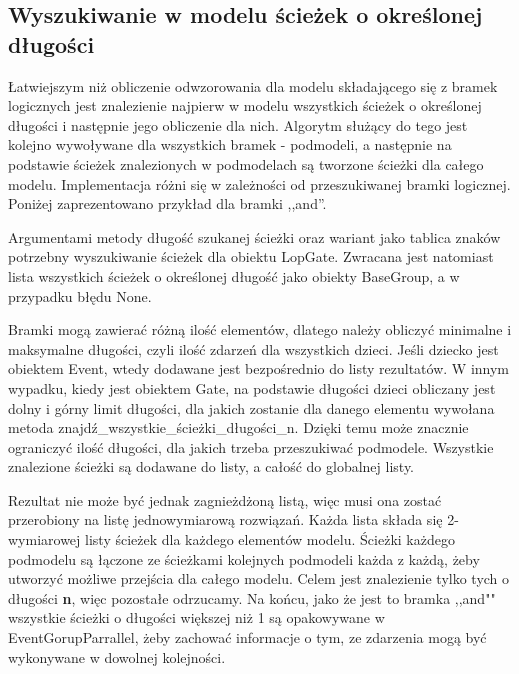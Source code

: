 \subsection{Wyszukiwanie w modelu ścieżek o określonej długości}

Łatwiejszym niż obliczenie odwzorowania dla modelu składającego się z bramek logicznych jest znalezienie najpierw w modelu wszystkich ścieżek o określonej długości i następnie jego obliczenie dla nich. Algorytm służący do tego jest kolejno wywoływane dla wszystkich bramek - podmodeli, a następnie na podstawie ścieżek znalezionych w podmodelach są tworzone ścieżki dla całego modelu. Implementacja różni się w zależności od przeszukiwanej bramki logicznej. Poniżej zaprezentowano przykład dla bramki ,,and''.  

Argumentami metody długość szukanej ścieżki oraz wariant jako tablica znaków potrzebny wyszukiwanie ścieżek dla obiektu LopGate. Zwracana jest natomiast lista wszystkich ścieżek o określonej długość jako obiekty BaseGroup, a w przypadku błędu None.

Bramki mogą zawierać różną ilość elementów, dlatego należy obliczyć minimalne i maksymalne długości, czyli ilość zdarzeń dla wszystkich dzieci. Jeśli dziecko jest obiektem Event, wtedy dodawane jest bezpośrednio do listy rezultatów. W innym wypadku, kiedy jest obiektem Gate, na podstawie długości dzieci obliczany jest dolny i górny limit długości, dla jakich zostanie dla danego elementu wywołana metoda znajdź{\_}wszystkie{\_}ścieżki{\_}długości{\_}n. Dzięki temu może znacznie ograniczyć ilość długości, dla jakich trzeba przeszukiwać podmodele. Wszystkie znalezione ścieżki są dodawane do listy, a całość do globalnej listy. 

Rezultat nie może być jednak zagnieżdżoną listą, więc musi ona zostać przerobiony na listę jednowymiarową rozwiązań. Każda lista składa się 2-wymiarowej listy ścieżek dla każdego elementów modelu. Ścieżki każdego podmodelu są łączone ze ścieżkami kolejnych podmodeli każda z każdą, żeby utworzyć możliwe przejścia dla całego modelu. Celem jest znalezienie tylko tych o długości \textbf{n}, więc pozostałe odrzucamy. Na końcu, jako że jest to bramka ,,and"" wszystkie ścieżki o długości większej niż 1 są opakowywane w EventGorupParrallel, żeby zachować informacje o tym, ze zdarzenia mogą być wykonywane w dowolnej kolejności.
\clearpage

